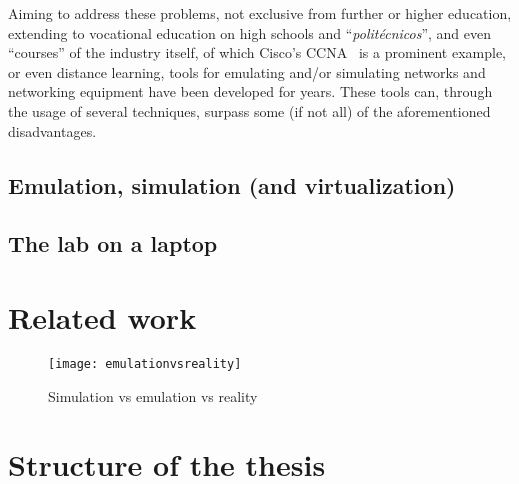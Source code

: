 Aiming to address these problems, not exclusive from further or higher education, extending to vocational education on high schools and ``\emph{politécnicos}'', and even ``courses'' of the industry itself, of which Cisco's CCNA~\cite{ccna} is a prominent example, or even distance learning, tools for emulating and/or simulating networks and networking equipment have been developed for years. %
These tools can, through the usage of several techniques, surpass some (if not all) of the aforementioned disadvantages.

\subsection{Emulation, simulation (and virtualization)}
\label{subsec:emulsimvirt}


\subsection{The lab on a laptop}
\label{subsec:thelabonalaptop}



\section{Related work}
\label{sec:relatedwork}







\begin{figure}
  \centering
  \texttt{[image: emulationvsreality]}
  \caption{Simulation vs emulation vs reality}
  \label{fig:emulationvsreality}
\end{figure}


\section{Structure of the thesis}
\label{sec:structure}


